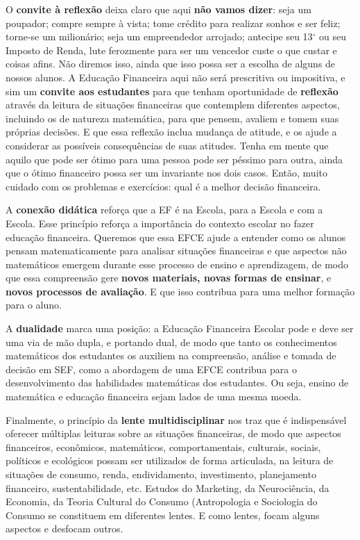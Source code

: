\begin{apresentacao}
O \textbf{convite à reflexão} deixa claro que aqui \textbf{não vamos dizer}: seja um poupador; compre sempre à vista; tome crédito para realizar sonhos e ser feliz; torne-se um milionário; seja um empreendedor arrojado; antecipe seu 13$^{\circ}$ ou seu Imposto de Renda, lute ferozmente para ser um vencedor custe o que custar e coisas afins. Não diremos isso, ainda que isso possa ser a escolha de alguns de nossos alunos. A Educação Financeira aqui não será prescritiva ou impositiva, e sim um  \textbf{convite aos estudantes} para que tenham oportunidade de \textbf{reflexão} através da leitura de situações financeiras que contemplem diferentes aspectos, incluindo os de natureza matemática, para que pensem, avaliem e tomem suas próprias decisões. E que essa reflexão inclua mudança de atitude, e os ajude a considerar as possíveis consequências de suas atitudes. Tenha em mente que aquilo que pode ser ótimo para uma pessoa pode ser péssimo para outra, ainda que o ótimo financeiro possa ser um invariante nos dois casos. Então, muito cuidado com os problemas e exercícios: qual é a melhor decisão financeira.

A \textbf{conexão didática} reforça que a EF é na Escola, para a Escola e com a Escola. Esse princípio reforça a importância do contexto escolar no fazer educação financeira. Queremos que essa EFCE ajude a entender como os alunos pensam matematicamente para analisar situações financeiras e que aspectos não matemáticos emergem durante esse processo de ensino e aprendizagem, de modo que essa compreensão gere \textbf{novos materiais, novas formas de ensinar}, e \textbf{novos processos de avaliação}. E que isso contribua para uma melhor formação para o aluno.

A \textbf{dualidade} marca uma posição: a Educação Financeira Escolar pode e deve ser uma via de mão dupla, e portando dual, de modo que tanto os conhecimentos matemáticos dos estudantes os auxiliem na compreensão, análise e tomada de decisão em SEF, como a abordagem de uma EFCE contribua para o desenvolvimento das habilidades matemáticas dos estudantes. Ou seja, ensino de matemática e educação financeira sejam lados de uma mesma moeda.

Finalmente, o princípio da \textbf{lente multidisciplinar} nos traz que é indispensável oferecer múltiplas leituras sobre as situações financeiras, de modo que aspectos financeiros, econômicos, matemáticos, comportamentais, culturais, sociais, políticos e ecológicos possam ser utilizados de forma articulada, na leitura de situações de consumo, renda, endividamento, investimento, planejamento financeiro, sustentabilidade, etc. Estudos do Marketing, da Neurociência, da Economia, da Teoria Cultural do Consumo (Antropologia e Sociologia do Consumo se constituem em diferentes lentes. E como lentes, focam alguns aspectos e desfocam outros.


\end{apresentacao}
